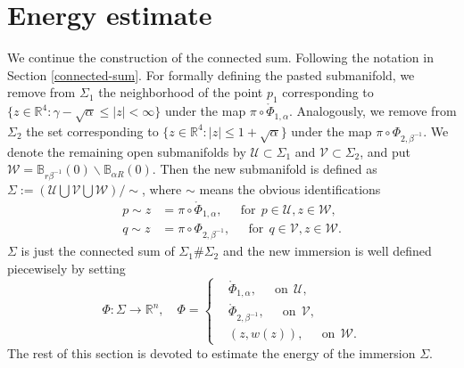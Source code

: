 \documentclass[11pt,letterpaper]{amsart}
\newcommand{\mU}{\mathcal{U}}
\newcommand{\mV}{\mathcal{V}}
\newcommand{\mW}{\mathcal{W}}
\newcommand{\bB}{\mathbb{B}}
\newcommand{\bR}{\mathbb{R}}
\theoremstyle{definition}
\theoremstyle{remark}
\numberwithin{equation}{section}
\begin{document}
\section{Energy estimate}\label{energy}
We continue the construction of the connected sum. Following the notation in Section \ref{connected-sum}. For formally defining the pasted submanifold, we remove from $\Sigma_1$ the neighborhood of the point $p_1$ corresponding to $\{z\in \bR^4:\gamma-\sqrt{\alpha}\leq |z|<\infty\}$ under the map $\pi\circ  \mathring{\Phi}_{1,\alpha}$. Analogously, we remove from $\Sigma_2$ the set corresponding to $\{z\in \bR^4: |z|\leq 1+\sqrt{\alpha}\}$ under the map $\pi\circ \Phi_{2, \beta^{-1}}$. We denote the remaining open submanifolds by $\mU\subset \Sigma_1$ and $\mV\subset \Sigma_2$, and put $\mW=\bB_{r\beta^{-1}}(0)\backslash \bB_{\alpha R}(0)$. Then the new submanifold is defined as $\Sigma:=\left(\mU\bigcup \mV\bigcup \mW\right)/ \sim$, where $\sim$ means the obvious identifications
\begin{equation*}
    \begin{split}
        p\sim z&=\pi\circ  \mathring{\Phi}_{1,\alpha}, \quad ~~\mbox{for}~~ p\in \mU, z\in \mW,\\
        q\sim z&=\pi\circ  \Phi_{2,\beta^{-1}}, \quad ~~\mbox{for}~~ q\in \mV, z\in \mW.
    \end{split}
\end{equation*}
$\Sigma$ is just the connected sum of $\Sigma_1 \# \Sigma_2$ and the new immersion is well defined piecewisely by setting
\begin{equation*}
\Phi: \Sigma\to \bR^n, \quad \Phi=\left\{
    \begin{split}
        &\mathring{\Phi}_{1,\alpha}, \quad ~~\mbox{on}~~ \mU,\\
        &\mathring{\Phi}_{2,\beta^{-1}}, \quad ~~\mbox{on}~~ \mV,\\
        &(z,w(z)),  \quad ~~\mbox{on}~~ \mW.
    \end{split}
    \right.
\end{equation*}
The rest of this section is devoted to estimate the energy of the immersion $\Sigma$.
\end{document}
